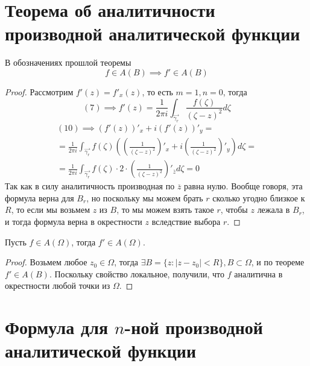 \documentclass[main]{subfiles}
\begin{document}
\section{Теорема об аналитичности производной аналитической функции}
\begin{theorem}
    В обозначениях прошлой теоремы
    \[f \in A(B) \implies f' \in A(B) \tag{9}\]
\end{theorem}
\begin{proof}
    Рассмотрим $f'(z) = f'_x(z)$, то есть $m = 1, n = 0$, тогда
    \[(7) \implies f'(z) = \frac{1}{2 \pi i}  \int_{\overrightarrow{\gamma_r}} \frac{f(\zeta)}{(\zeta - z)^{2}} d \zeta \tag{10}\]
    \begin{multline*}
        (10) \implies (f'(z))'_x + i (f'(z))'_y = \\
        = \frac{1}{2 \pi i} \int_{\overrightarrow{\gamma_r}} f(\zeta) \left(\left(\frac{1}{(\zeta - z)^{2}}\right)'_x + i \left(\frac{1}{(\zeta - z)^{2}}\right)'_y\right) d\zeta = \\
        = \frac{1}{2 \pi i} \int_{\overrightarrow{\gamma_r}} f(\zeta) \cdot 2 \cdot \left(\frac{1}{(\zeta - z)^{2}}\right)'_{\overline{z}} d\zeta = 0
    \end{multline*}
    Так как в силу аналитичность производная по $\overline{z}$ равна нулю.
    Вообще говоря, эта формула верна для $B_r$, но поскольку мы можем брать $r$ сколько угодно близкое к $R$, то если мы возьмем $z$ из $B$, то мы можем взять такое $r$, чтобы $z$ лежала в $B_r$, и тогда формула верна в окрестности $z$ вследствие выбора $r$.
\end{proof}
\begin{corollary}
    Пусть $f \in A(\Omega)$, тогда $f' \in A(\Omega)$.
\end{corollary}
\begin{proof}
    Возьмем любое $z_0 \in \Omega$, тогда $\exists B = \{z: |z - z_0| < R\}, B \subset \Omega$, и по теореме $f'\in A(B)$.
    Поскольку свойство локальное, получили, что $f$ аналитична в окрестности любой точки из $\Omega$.
\end{proof}

\section{Формула для \texorpdfstring{$n$}{n}-ной производной аналитической функции}
\end{document}
